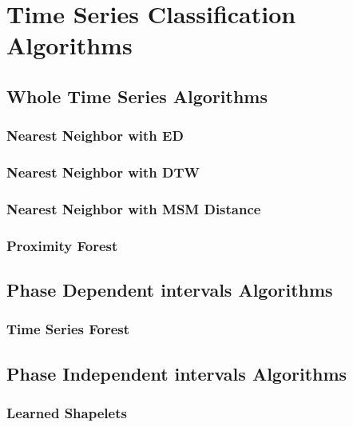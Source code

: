 \null\newpage

\section{Time Series Classification Algorithms}


\subsection{Whole Time Series Algorithms}

\subsubsection{Nearest Neighbor with ED}

\subsubsection{Nearest Neighbor with DTW}

\subsubsection{Nearest Neighbor with MSM Distance}

\subsubsection{Proximity Forest}


\subsection{Phase Dependent intervals Algorithms}

\subsubsection{Time Series Forest}


\subsection{Phase Independent intervals Algorithms}

\subsubsection{Learned Shapelets}

